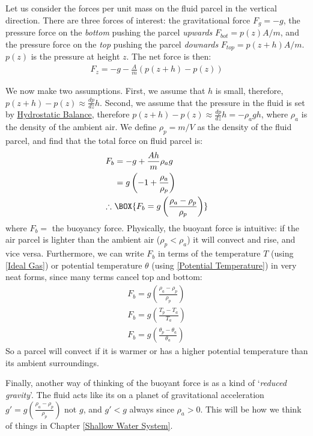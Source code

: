Let us consider the forces per unit mass on the fluid parcel in the vertical direction. There are three forces of interest: the gravitational force $F_g=-g$, the pressure force on the \textit{bottom} pushing the parcel \textit{upwards} $F_{bot}=p(z)A/m$, and the pressure force on the \textit{top} pushing the parcel \textit{downards} $F_{top}=p(z+h)A/m$. $p(z)$ is the pressure at height $z$. The net force is then:
\begin{align*}
    F_z=-g-\frac{A}{m}(p(z+h)-p(z))
\end{align*}

We now make two assumptions. First, we assume that $h$ is small, therefore, $p(z+h)-p(z)\approx \frac{dp}{dz} h$. Second, we assume that the pressure in the fluid is set by \hyperref[Hydrostatic Balance]{Hydrostatic Balance}, therefore $p(z+h)-p(z)\approx \frac{dp}{dz} h=-\rho_a g h$, where $\rho_a$ is the density of the ambient air. We define $\rho_p=m/V$ as the density of the fluid parcel, and find that the total force on fluid parcel  is:
\begin{align}
    F_b&=-g+\frac{Ah}{m}\rho_a g\nonumber\\
    &=g\left( -1+ \frac{\rho_a}{\rho_p}\right)\nonumber\\
    \label{Buoyancy Force}
    \therefore \,\,& \BOX{F_b=g\left( \frac{\rho_a-\rho_p}{\rho_p} \right)}
\end{align}
where $F_b=$ the buoyancy force. Physically, the buoyant force is intuitive: if the air parcel is lighter than the ambient air ($\rho_p<\rho_a$) it will convect and rise, and vice versa. Furthermore, we can write $F_b$ in terms of the temperature $T$ (using \ref{Ideal Gas}) or potential temperature $\theta$ (using \ref{Potential Temperature}) in very neat forms, since many terms cancel top and bottom:
\begin{align}
    F_b=g\left( \frac{\rho_a-\rho_p}{\rho_p} \right)\nonumber\\
    \label{Buoyancy Force Temp}
    \boxed{F_b=g\left( \frac{T_p-T_a}{T_a} \right)}\\
    \boxed{F_b=g\left( \frac{\theta_p-\theta_a}{\theta_a} \right)}
\end{align}
So a parcel will convect if it is warmer or has a higher potential temperature than its ambient surroundings.

Finally, another way of thinking of the buoyant force is as a kind of `\textit{reduced gravity}'. The fluid acts like its on a planet of gravitational acceleration $g'=g\left( \frac{\rho_a-\rho_p}{\rho_p} \right)$ not $g$, and $g'<g$ always since $\rho_a>0$. This will be how we think of things in Chapter \ref{Shallow Water System}. 

